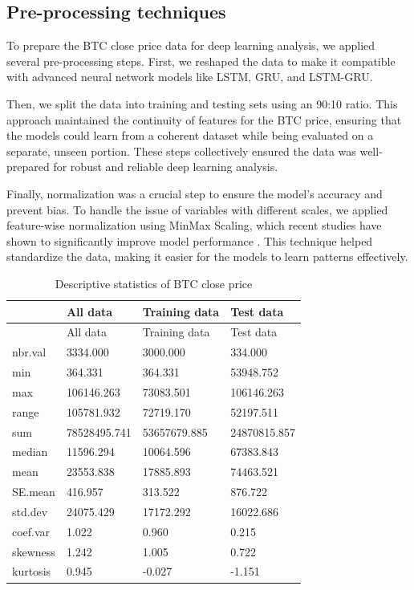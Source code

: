 \documentclass[]{interact}
\theoremstyle{plain}%
\theoremstyle{definition}
\theoremstyle{remark}
\begin{document}
\subsection{Pre-processing techniques}\label{pre-processing-techniques}

To prepare the BTC close price data for deep learning analysis, we
applied several pre-processing steps. First, we reshaped the data to
make it compatible with advanced neural network models like LSTM, GRU,
and LSTM-GRU.

Then, we split the data into training and testing sets using an 90:10
ratio. This approach maintained the continuity of features for the BTC
price, ensuring that the models could learn from a coherent dataset
while being evaluated on a separate, unseen portion. These steps
collectively ensured the data was well-prepared for robust and reliable
deep learning analysis.

Finally, normalization was a crucial step to ensure the model's accuracy
and prevent bias. To handle the issue of variables with different
scales, we applied feature-wise normalization using MinMax Scaling,
which recent studies have shown to significantly improve model
performance \citep{ahsan2021}. This technique helped standardize the
data, making it easier for the models to learn patterns effectively.

\begin{longtable}[]{@{}llll@{}}
\caption{Descriptive statistics of BTC close price}\tabularnewline
\toprule\noalign{}
& All data & Training data & Test data \\
\midrule\noalign{}
\endfirsthead
\toprule\noalign{}
& All data & Training data & Test data \\
\midrule\noalign{}
\endhead
\bottomrule\noalign{}
\endlastfoot
nbr.val & 3334.000 & 3000.000 & 334.000 \\
min & 364.331 & 364.331 & 53948.752 \\
max & 106146.263 & 73083.501 & 106146.263 \\
range & 105781.932 & 72719.170 & 52197.511 \\
sum & 78528495.741 & 53657679.885 & 24870815.857 \\
median & 11596.294 & 10064.596 & 67383.843 \\
mean & 23553.838 & 17885.893 & 74463.521 \\
SE.mean & 416.957 & 313.522 & 876.722 \\
std.dev & 24075.429 & 17172.292 & 16022.686 \\
coef.var & 1.022 & 0.960 & 0.215 \\
skewness & 1.242 & 1.005 & 0.722 \\
kurtosis & 0.945 & -0.027 & -1.151 \\
\end{longtable}
\end{document}
